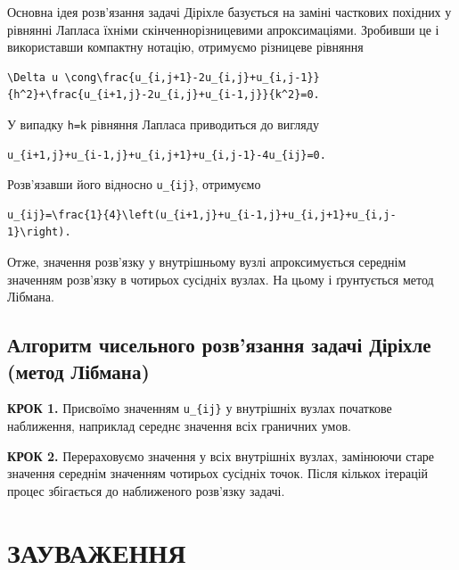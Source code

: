 \documentclass[
  ukrainian,
]{article}
\begin{document}
Основна ідея розв'язання задачі Діріхле базується на заміні часткових
похідних у рівнянні Лапласа їхніми скінченнорізницевими апроксимаціями.
Зробивши це і використавши компактну нотацію, отримуємо різницеве
рівняння

\begin{verbatim}
\Delta u \cong\frac{u_{i,j+1}-2u_{i,j}+u_{i,j-1}}{h^2}+\frac{u_{i+1,j}-2u_{i,j}+u_{i-1,j}}{k^2}=0.
\end{verbatim}

У випадку \texttt{h=k} рівняння Лапласа приводиться до вигляду

\begin{verbatim}
u_{i+1,j}+u_{i-1,j}+u_{i,j+1}+u_{i,j-1}-4u_{ij}=0.
\end{verbatim}

Розв'язавши його відносно \texttt{u\_\{ij\}}, отримуємо

\begin{verbatim}
u_{ij}=\frac{1}{4}\left(u_{i+1,j}+u_{i-1,j}+u_{i,j+1}+u_{i,j-1}\right).
\end{verbatim}

Отже, значення розв'язку у внутрішньому вузлі апроксимується середнім
значенням розв'язку в чотирьох сусідніх вузлах. На цьому і ґрунтується
метод Лібмана.

\subsection{Алгоритм чисельного розв'язання задачі Діріхле (метод
Лібмана)}\label{ux430ux43bux433ux43eux440ux438ux442ux43c-ux447ux438ux441ux435ux43bux44cux43dux43eux433ux43e-ux440ux43eux437ux432ux44fux437ux430ux43dux43dux44f-ux437ux430ux434ux430ux447ux456-ux434ux456ux440ux456ux445ux43bux435-ux43cux435ux442ux43eux434-ux43bux456ux431ux43cux430ux43dux430}

\textbf{КРОК 1.} Присвоїмо значенням \texttt{u\_\{ij\}} у внутрішніх
вузлах початкове наближення, наприклад середнє значення всіх граничних
умов.

\textbf{КРОК 2.} Перераховуємо значення у всіх внутрішніх вузлах,
замінюючи старе значення середнім значенням чотирьох сусідніх точок.
Після кількох ітерацій процес збігається до наближеного розв'язку
задачі.

\section{ЗАУВАЖЕННЯ}\label{ux437ux430ux443ux432ux430ux436ux435ux43dux43dux44f-6}
\end{document}
